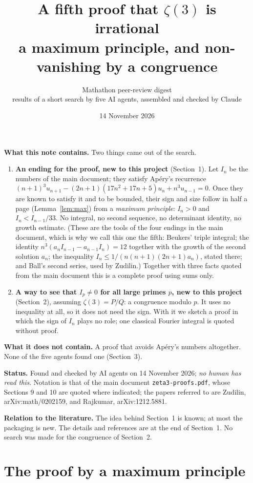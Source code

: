 \documentclass[11pt]{article}
\title{A fifth proof that $\zeta(3)$ is irrational\\[2mm]
\large a maximum principle, and non-vanishing by a congruence}
\author{Mathathon peer-review digest\\
\small results of a short search by five AI agents, assembled and checked by Claude}
\date{14 November 2026}
\begin{document}
\maketitle

\noindent\textbf{What this note contains.} Two things came out of the search.
\begin{enumerate}
\item \textbf{An ending for the proof, new to this project} (Section~1). Let $I_n$ be the numbers of
the main document; they satisfy Ap\'ery's recurrence
$(n+1)^3u_{n+1}-(2n+1)(17n^2+17n+5)u_n+n^3u_{n-1}=0$. Once they are known to satisfy it and to be
bounded, their sign and size follow in half a page (Lemma~\ref{lem:max}) from a \emph{maximum
principle}: $I_n>0$ and $I_n<I_{n-1}/33$. No integral, no second sequence, no determinant identity,
no growth estimate. (These are the tools of the four endings in the main document, which is why we
call this one the fifth: Beukers' triple integral; the identity $n^3(a_nI_{n-1}-a_{n-1}I_n)=12$
together with the growth of the second solution $a_n$; the inequality
$I_n\le1/(n(n+1)(2n+1)a_n)$, stated there; and Ball's second series, used by Zudilin.) Together
with three facts quoted from the main document this is a complete proof using sums only.
\item \textbf{A way to see that $I_p\ne0$ for all large primes $p$, new to this project}
(Section~2), assuming $\zeta(3)=P/Q$: a congruence modulo $p$. It uses no inequality at all, so it
does not need the sign. With it we sketch a proof in which the sign of $I_n$ plays no role; one
classical Fourier integral is quoted without proof.
\end{enumerate}
\noindent\textbf{What it does not contain.} A proof that avoids Ap\'ery's numbers altogether. None of
the five agents found one (Section~3).

\smallskip\noindent\textbf{Status.} Found and checked by AI agents on 14 November 2026;
\emph{no human has read this}. Notation is that of the main document
\texttt{zeta3-proofs.pdf}, whose Sections 9 and 10 are quoted where indicated; the papers referred to
are Zudilin, arXiv:math/0202159, and Rajkumar, arXiv:1212.5881.

\smallskip\noindent\textbf{Relation to the literature.} The idea behind Section~1 is known; at
most the packaging is new. The details and references are at the end of Section~1. No search was
made for the congruence of Section~2.

\section{The proof by a maximum principle}
\end{document}
